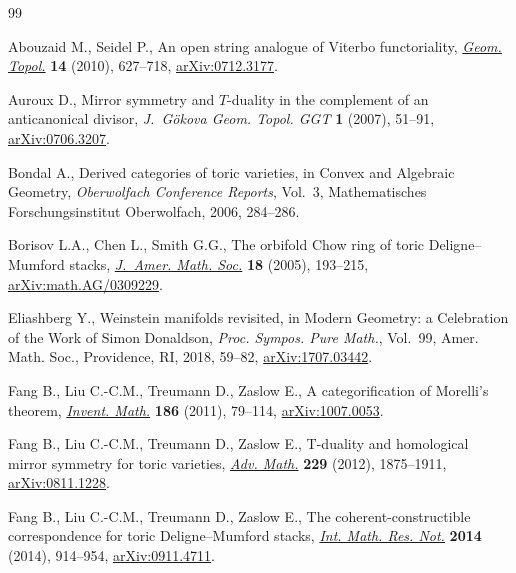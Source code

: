 \documentclass[pdftex]{sigma}%
\numberwithin{equation}{section}
\begin{document}
\begin{thebibliography}{99}
\footnotesize\itemsep=0pt

Abouzaid M., Seidel P., An open string analogue of {V}iterbo functoriality,
 \href{https://doi.org/10.2140/gt.2010.14.627}{\textit{Geom. Topol.}} \textbf{14} (2010), 627--718, \href{https://arxiv.org/abs/0712.3177}{arXiv:0712.3177}.

Auroux D., Mirror symmetry and {$T$}-duality in the complement of an
 anticanonical divisor, \textit{J.~G\"okova Geom. Topol. GGT} \textbf{1}
 (2007), 51--91, \href{https://arxiv.org/abs/0706.3207}{arXiv:0706.3207}.

Bondal A., Derived categories of toric varieties, in Convex and Algebraic
 Geometry, \textit{Oberwolfach Conference Reports}, Vol.~3, Mathematisches
 Forschungsinstitut Oberwolfach, 2006, 284--286.

Borisov L.A., Chen L., Smith G.G., The orbifold {C}how ring of toric
 {D}eligne--{M}umford stacks, \href{https://doi.org/10.1090/S0894-0347-04-00471-0}{\textit{J.~Amer. Math. Soc.}} \textbf{18} (2005),
 193--215, \href{https://arxiv.org/abs/math.AG/0309229}{arXiv:math.AG/0309229}.

Eliashberg Y., Weinstein manifolds revisited, in Modern Geometry: a Celebration
 of the Work of {S}imon {D}onaldson, \textit{Proc. Sympos. Pure Math.},
 Vol.~99, Amer. Math. Soc., Providence, RI, 2018, 59--82, \href{https://arxiv.org/abs/1707.03442}{arXiv:1707.03442}.

Fang B., Liu C.-C.M., Treumann D., Zaslow E., A categorification of {M}orelli's
 theorem, \href{https://doi.org/10.1007/s00222-011-0315-x}{\textit{Invent. Math.}} \textbf{186} (2011), 79--114,
 \href{https://arxiv.org/abs/1007.0053}{arXiv:1007.0053}.

Fang B., Liu C.-C.M., Treumann D., Zaslow E., T-duality and homological mirror
 symmetry for toric varieties, \href{https://doi.org/10.1016/j.aim.2011.10.022}{\textit{Adv. Math.}} \textbf{229} (2012),
 1875--1911, \href{https://arxiv.org/abs/0811.1228}{arXiv:0811.1228}.

Fang B., Liu C.-C.M., Treumann D., Zaslow E., The coherent-constructible
 correspondence for toric {D}eligne--{M}umford stacks, \href{https://doi.org/10.1093/imrn/rns235}{\textit{Int. Math. Res.
 Not.}} \textbf{2014} (2014), 914--954, \href{https://arxiv.org/abs/0911.4711}{arXiv:0911.4711}.


\end{thebibliography}
\end{document}
